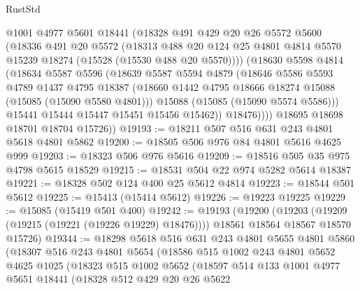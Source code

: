 \begin{lexlean}{RustStd}
\begin{coremodule}
            @1001
            @4977
            @5601
            @18441
            (@18328
              @491
              @429
              @20
              @26
              @5572
              @5600
              (@18336
                @491
                @20
                @5572
                (@18313
                  @488
                  @20
                  @124
                  @25
                  @4801
                  @4814
                  @5570
                  @15239
                  @18274
                  (@15528 (@15530 @488 @20 @5570))))
              (@18630
                @5598
                @4814
                (@18634
                  @5587
                  @5596
                  (@18639
                    @5587
                    @5594
                    @4879
                    (@18646
                      @5586
                      @5593
                      @4789
                      @1437
                      @4795
                      @18387
                      (@18660 @1442 @4795 @18666 @18274 @15088 (@15085 (@15090 @5580 @4801)))
                      @15088
                      (@15085 (@15090 @5574 @5586)))
                    @15441
                    @15444
                    @15447
                    @15451
                    @15456
                    @15462))
                @18476))))
        @18695
        @18698
        @18701
        @18704
        @15726))
@19193 := @18211 @507 @516 @631 @243 @4801 @5618 @4801 @5862
@19200 := @18505 @506 @976 @84 @4801 @5616 @4625 @999
@19203 := @18323 @506 @976 @5616
@19209 := @18516 @505 @35 @975 @4798 @5615 @18529
@19215 := @18531 @504 @22 @974 @5282 @5614 @18387
@19221 := @18328 @502 @124 @400 @25 @5612 @4814
@19223 := @18544 @501 @5612
@19225 := @15413 (@15414 @5612)
@19226 := @19223 @19225
@19229 := @15085 (@15419 @501 @400)
@19242 := @19193
    (@19200
      (@19203 (@19209 (@19215 (@19221 (@19226 @19229) @18476))))
      @18561
      @18564
      @18567
      @18570
      @15726)
@19344 := @18298
    @5618
    @516
    @631
    @243
    @4801
    @5655
    @4801
    @5860
    (@18307
      @516
      @243
      @4801
      @5654
      (@18586
        @515
        @1002
        @243
        @4801
        @5652
        @4625
        @1025
        (@18323
          @515
          @1002
          @5652
          (@18597
            @514
            @133
            @1001
            @4977
            @5651
            @18441
            (@18328
              @512
              @429
              @20
              @26
              @5622

\end{coremodule}
\end{lexlean}

